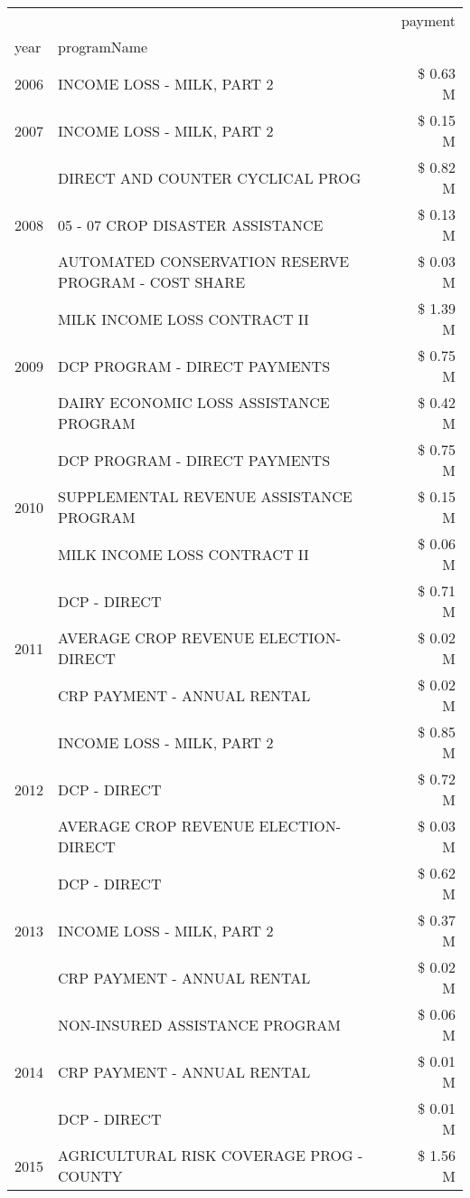 \begin{tabular}{llr}
\toprule
 &  & payment \\
year & programName &  \\
\midrule
2006 & INCOME LOSS - MILK, PART 2 & \$ 0.63 M \\
\cline{1-3}
2007 & INCOME LOSS - MILK, PART 2 & \$ 0.15 M \\
\cline{1-3}
\multirow[t]{3}{*}{2008} & DIRECT AND COUNTER CYCLICAL PROG & \$ 0.82 M \\
 & 05 - 07 CROP DISASTER ASSISTANCE & \$ 0.13 M \\
 & AUTOMATED CONSERVATION RESERVE PROGRAM - COST SHARE & \$ 0.03 M \\
\cline{1-3}
\multirow[t]{3}{*}{2009} & MILK INCOME LOSS CONTRACT II & \$ 1.39 M \\
 & DCP PROGRAM - DIRECT PAYMENTS & \$ 0.75 M \\
 & DAIRY ECONOMIC LOSS ASSISTANCE PROGRAM & \$ 0.42 M \\
\cline{1-3}
\multirow[t]{3}{*}{2010} & DCP PROGRAM - DIRECT PAYMENTS & \$ 0.75 M \\
 & SUPPLEMENTAL REVENUE ASSISTANCE PROGRAM & \$ 0.15 M \\
 & MILK INCOME LOSS CONTRACT II & \$ 0.06 M \\
\cline{1-3}
\multirow[t]{3}{*}{2011} & DCP - DIRECT & \$ 0.71 M \\
 & AVERAGE CROP REVENUE ELECTION-DIRECT & \$ 0.02 M \\
 & CRP PAYMENT - ANNUAL RENTAL & \$ 0.02 M \\
\cline{1-3}
\multirow[t]{3}{*}{2012} & INCOME LOSS - MILK, PART 2 & \$ 0.85 M \\
 & DCP - DIRECT & \$ 0.72 M \\
 & AVERAGE CROP REVENUE ELECTION-DIRECT & \$ 0.03 M \\
\cline{1-3}
\multirow[t]{3}{*}{2013} & DCP - DIRECT & \$ 0.62 M \\
 & INCOME LOSS - MILK, PART 2 & \$ 0.37 M \\
 & CRP PAYMENT - ANNUAL RENTAL & \$ 0.02 M \\
\cline{1-3}
\multirow[t]{3}{*}{2014} & NON-INSURED ASSISTANCE PROGRAM & \$ 0.06 M \\
 & CRP PAYMENT - ANNUAL RENTAL & \$ 0.01 M \\
 & DCP - DIRECT & \$ 0.01 M \\
\cline{1-3}
\multirow[t]{3}{*}{2015} & AGRICULTURAL RISK COVERAGE PROG - COUNTY & \$ 1.56 M \\

\end{tabular}
